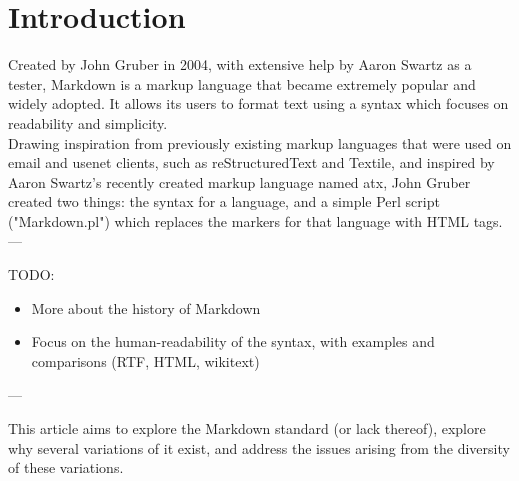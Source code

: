 \chapter{Introduction}

Created by John Gruber in 2004, with extensive help by Aaron Swartz as a tester, Markdown is a markup language that became extremely popular and widely adopted. It allows its users to format text using a syntax which focuses on readability and simplicity.\\

Drawing inspiration from previously existing markup languages that were used on email and usenet clients, such as reStructuredText and Textile, and inspired by Aaron Swartz's recently created markup language named atx, John Gruber created two things: the syntax for a language, and a simple Perl script ("Markdown.pl") which replaces the markers for that language with HTML tags.\\

---

TODO:

\begin{itemize}
	\item More about the history of Markdown
	\item Focus on the human-readability of the syntax, with examples and comparisons (RTF, HTML, wikitext)
\end{itemize}

---

This article aims to explore the Markdown standard (or lack thereof), explore why several variations of it exist, and address the issues arising from the diversity of these variations.